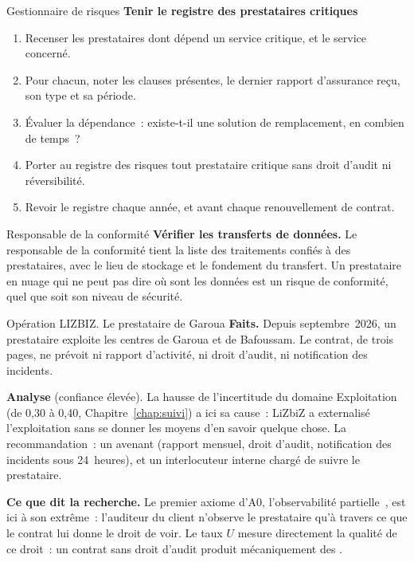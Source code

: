 \begin{boxmetier}{Gestionnaire de risques}
\textbf{Tenir le registre des prestataires critiques}
\begin{enumerate}
    \item Recenser les prestataires dont dépend un service critique, et
          le service concerné.
    \item Pour chacun, noter les clauses présentes, le dernier rapport
          d'assurance reçu, son type et sa période.
    \item Évaluer la dépendance~: existe-t-il une solution de remplacement,
          en combien de temps~?
    \item Porter au registre des risques tout prestataire critique sans
          droit d'audit ni réversibilité.
    \item Revoir le registre chaque année, et avant chaque renouvellement
          de contrat.
\end{enumerate}
\end{boxmetier}

\begin{boxmetier}{Responsable de la conformité}
\textbf{Vérifier les transferts de données.} Le responsable de la
conformité tient la liste des traitements confiés à des prestataires, avec
le lieu de stockage et le fondement du transfert. Un prestataire en nuage
qui ne peut pas dire où sont les données est un risque de conformité, quel
que soit son niveau de sécurité.
\end{boxmetier}

\begin{boxscenario}{Opération LIZBIZ. Le prestataire de Garoua}
\textbf{Faits.} Depuis septembre~2026, un prestataire exploite les centres
de Garoua et de Bafoussam. Le contrat, de trois pages, ne prévoit ni
rapport d'activité, ni droit d'audit, ni notification des incidents.

\medskip
\textbf{Analyse} (confiance élevée). La hausse de l'incertitude du domaine
Exploitation (de 0,30 à 0,40, Chapitre~\ref{chap:suivi}) a ici sa cause~:
LiZbiZ a externalisé l'exploitation sans se donner les moyens d'en savoir
quelque chose. La recommandation~: un avenant (rapport mensuel, droit
d'audit, notification des incidents sous 24~heures), et un interlocuteur
interne chargé de suivre le prestataire.
\end{boxscenario}

\begin{boxinfo}
\textbf{Ce que dit la recherche.} Le premier axiome d'A0, l'observabilité
partielle~\cite{minka2026auditologie}, est ici à son extrême~: l'auditeur
du client n'observe le prestataire qu'à travers ce que le contrat lui donne
le droit de voir. Le taux $U$ mesure directement la qualité de ce droit~:
un contrat sans droit d'audit produit mécaniquement des \NEK{}.
\end{boxinfo}

